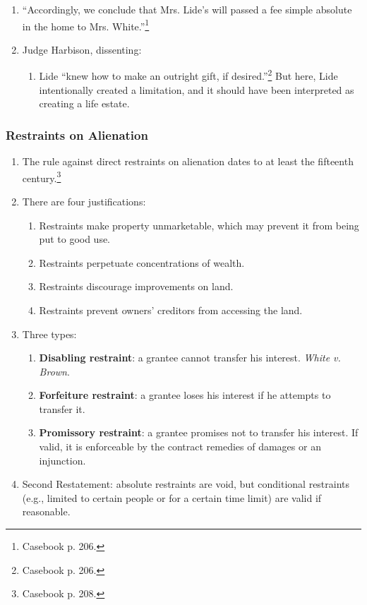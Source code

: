 \begin{enumerate}
    \item ``Accordingly, we conclude that Mrs. Lide's will passed a fee 
    simple absolute in the home to Mrs. White.''\footnote{Casebook p. 206.}
    \item Judge Harbison, dissenting:
    \begin{enumerate}
        \item Lide ``knew how to make an outright gift, if 
        desired.''\footnote{Casebook p. 206.} But here, Lide intentionally 
        created a limitation, and it should have been interpreted as creating 
        a life estate.
    \end{enumerate}
\end{enumerate}

\subsubsection{Restraints on Alienation}

\begin{enumerate}
    \item The rule against direct restraints on alienation dates to at least 
    the fifteenth century.\footnote{Casebook p. 208.}
    \item There are four justifications:
    \begin{enumerate}
        \item Restraints make property unmarketable, which may prevent it from 
        being put to good use.
        \item Restraints perpetuate concentrations of wealth.
        \item Restraints discourage improvements on land.
        \item Restraints prevent owners' creditors from accessing the land.
    \end{enumerate}
    \item Three types:
    \begin{enumerate}
        \item \textbf{Disabling restraint}: a grantee cannot transfer his 
        interest. \emph{White v. Brown}.
        \item \textbf{Forfeiture restraint}: a grantee loses his interest if 
        he attempts to transfer it.
        \item \textbf{Promissory restraint}: a grantee promises not to 
        transfer his interest. If valid, it is enforceable by the contract 
        remedies of damages or an injunction.
    \end{enumerate}
    \item Second Restatement: absolute restraints are void, but conditional 
    restraints (e.g., limited to certain people or for a certain time limit) 
    are valid if reasonable.
\end{enumerate}

